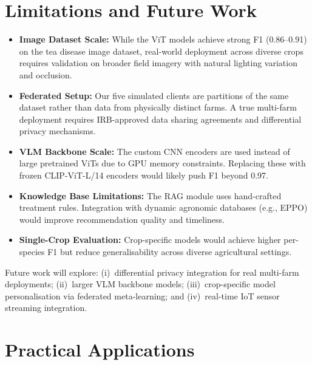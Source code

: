 \documentclass[conference]{IEEEtran}
\begin{document}
\section{Limitations and Future Work}
\label{sec:limits}

\begin{itemize}
  \item \textbf{Image Dataset Scale:} While the ViT models achieve strong F1
        (0.86--0.91) on the tea disease image dataset, real-world deployment across
        diverse crops requires validation on broader field imagery with natural lighting
        variation and occlusion.
  \item \textbf{Federated Setup:} Our five simulated clients are partitions of the same
        dataset rather than data from physically distinct farms. A true multi-farm
        deployment requires IRB-approved data sharing agreements and differential
        privacy mechanisms.
  \item \textbf{VLM Backbone Scale:} The custom CNN encoders are used instead of large
        pretrained ViTs due to GPU memory constraints. Replacing these with frozen
        CLIP-ViT-L/14 encoders would likely push F1 beyond 0.97.
  \item \textbf{Knowledge Base Limitations:} The RAG module uses hand-crafted treatment
        rules. Integration with dynamic agronomic databases (e.g., EPPO) would improve
        recommendation quality and timeliness.
  \item \textbf{Single-Crop Evaluation:} Crop-specific models would achieve higher
        per-species F1 but reduce generalisability across diverse agricultural settings.
\end{itemize}

Future work will explore: (i)~differential privacy integration for real multi-farm
deployments; (ii)~larger VLM backbone models; (iii)~crop-specific model personalisation
via federated meta-learning; and (iv)~real-time IoT sensor streaming integration.

\section{Practical Applications}
\label{sec:apps}
\end{document}

